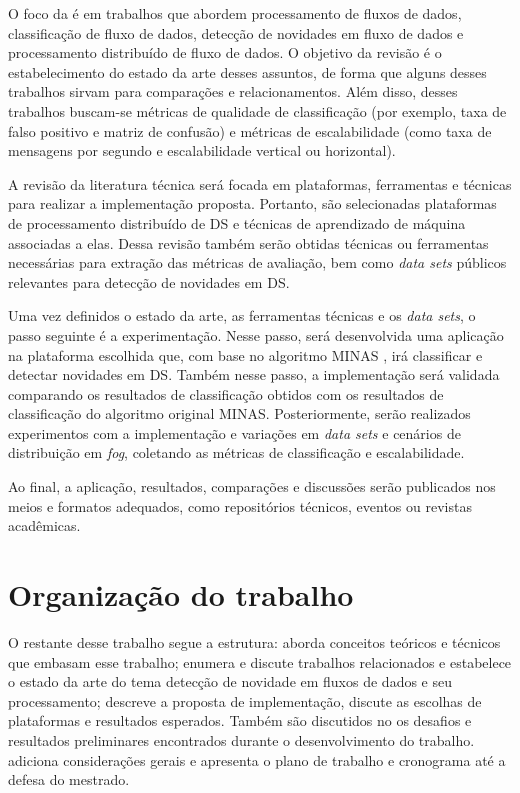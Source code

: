 O foco da  é em trabalhos que abordem
processamento de fluxos de dados, classificação de fluxo de dados, detecção de
novidades em fluxo de dados e processamento distribuído de fluxo de dados.
O objetivo da revisão é o estabelecimento do estado da arte desses assuntos,
de forma que alguns desses trabalhos sirvam para comparações e relacionamentos.
Além disso, desses trabalhos buscam-se métricas de qualidade de classificação
(por exemplo, taxa de falso positivo e matriz de confusão) e métricas de
escalabilidade (como taxa de mensagens por segundo e escalabilidade vertical ou
horizontal).

A revisão da literatura técnica será focada em plataformas, ferramentas e técnicas
para realizar a implementação proposta.
Portanto, são selecionadas plataformas de processamento distribuído de DS
e técnicas de aprendizado de máquina associadas a elas.
Dessa revisão também serão obtidas técnicas ou ferramentas necessárias
para extração das métricas de avaliação, bem como \emph{data sets}
públicos relevantes para detecção de novidades em DS.

Uma vez definidos o estado da arte, as ferramentas técnicas e os
\emph{data sets}, o passo seguinte é a experimentação.
Nesse passo, será desenvolvida uma aplicação na plataforma escolhida que, com base no
algoritmo MINAS \cite{Faria2015minas}, irá classificar e detectar novidades em DS.
Também nesse passo, a implementação será validada comparando os resultados de
classificação obtidos com os resultados de classificação do algoritmo original
MINAS.
Posteriormente, serão realizados experimentos com a implementação e variações em \emph{data sets} e
cenários de distribuição em \emph{fog}, coletando as métricas de classificação e escalabilidade.

Ao final, a aplicação, resultados, comparações e discussões serão publicados
nos meios e formatos adequados, como repositórios técnicos, eventos ou revistas
acadêmicas.

\section{Organização do trabalho}

O restante desse trabalho segue a estrutura:
 aborda conceitos teóricos e técnicos que embasam
esse trabalho;
 enumera e discute trabalhos relacionados e estabelece
o estado da arte do tema detecção de novidade em fluxos de dados e seu processamento;
 descreve a proposta de implementação, discute
as escolhas de plataformas e resultados esperados.
Também são discutidos no  os desafios e resultados preliminares encontrados
durante o desenvolvimento do trabalho.
 adiciona considerações gerais e apresenta o plano de trabalho
e cronograma até a defesa do mestrado.
